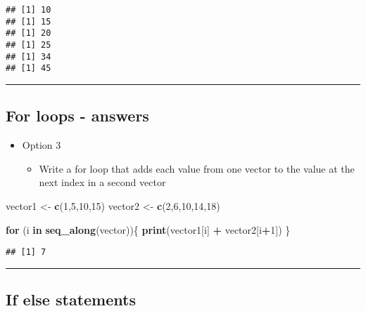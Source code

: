 \documentclass[]{article}
\newenvironment{Shaded}{\begin{snugshade}}{\end{snugshade}}
\newcommand{\ControlFlowTok}[1]{\textcolor[rgb]{0.13,0.29,0.53}{\textbf{#1}}}
\newcommand{\DecValTok}[1]{\textcolor[rgb]{0.00,0.00,0.81}{#1}}
\newcommand{\KeywordTok}[1]{\textcolor[rgb]{0.13,0.29,0.53}{\textbf{#1}}}
\newcommand{\NormalTok}[1]{#1}
\newcommand{\OperatorTok}[1]{\textcolor[rgb]{0.81,0.36,0.00}{\textbf{#1}}}
\newcommand{\StringTok}[1]{\textcolor[rgb]{0.31,0.60,0.02}{#1}}
\providecommand{\tightlist}{%
  \setlength{\itemsep}{0pt}\setlength{\parskip}{0pt}}
\begin{document}
\begin{verbatim}
## [1] 10
## [1] 15
## [1] 20
## [1] 25
## [1] 34
## [1] 45
\end{verbatim}

\begin{center}\rule{0.5\linewidth}{\linethickness}\end{center}

\hypertarget{for-loops---answers-2}{%
\subsection{For loops - answers}\label{for-loops---answers-2}}

\begin{itemize}
\tightlist
\item
  Option 3

  \begin{itemize}
  \tightlist
  \item
    Write a for loop that adds each value from one vector to the value
    at the next index in a second vector
  \end{itemize}
\end{itemize}

\begin{Shaded}
\begin{Highlighting}[]
\NormalTok{vector1 <-}\StringTok{ }\KeywordTok{c}\NormalTok{(}\DecValTok{1}\NormalTok{,}\DecValTok{5}\NormalTok{,}\DecValTok{10}\NormalTok{,}\DecValTok{15}\NormalTok{)}
\NormalTok{vector2 <-}\StringTok{ }\KeywordTok{c}\NormalTok{(}\DecValTok{2}\NormalTok{,}\DecValTok{6}\NormalTok{,}\DecValTok{10}\NormalTok{,}\DecValTok{14}\NormalTok{,}\DecValTok{18}\NormalTok{)}

\ControlFlowTok{for}\NormalTok{ (i }\ControlFlowTok{in} \KeywordTok{seq_along}\NormalTok{(vector))\{}
  \KeywordTok{print}\NormalTok{(vector1[i] }\OperatorTok{+}\StringTok{ }\NormalTok{vector2[i}\OperatorTok{+}\DecValTok{1}\NormalTok{])}
\NormalTok{\}}
\end{Highlighting}
\end{Shaded}

\begin{verbatim}
## [1] 7
\end{verbatim}

\begin{center}\rule{0.5\linewidth}{\linethickness}\end{center}

\hypertarget{if-else-statements}{%
\subsection{If else statements}\label{if-else-statements}}
\end{document}
